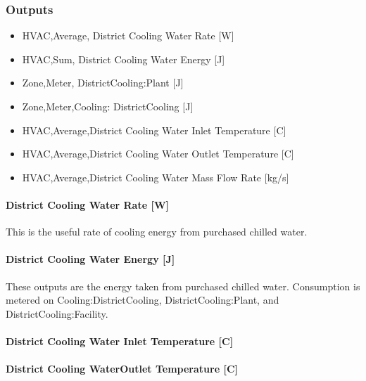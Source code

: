 \subsubsection{Outputs}\label{outputs-14-003}

\begin{itemize}
    \item
    HVAC,Average, District Cooling Water Rate {[}W{]}
    \item
    HVAC,Sum, District Cooling Water Energy {[}J{]}
    \item
    Zone,Meter, DistrictCooling:Plant {[}J{]}
    \item
    Zone,Meter,Cooling: DistrictCooling {[}J{]}
    \item
    HVAC,Average,District Cooling Water Inlet Temperature {[}C{]}
    \item
    HVAC,Average,District Cooling Water Outlet Temperature {[}C{]}
    \item
    HVAC,Average,District Cooling Water Mass Flow Rate {[}kg/s{]}
\end{itemize}

\paragraph{District Cooling Water Rate {[}W{]}}\label{district-cooling-chilled-water-rate-w}

This is the useful rate of cooling energy from purchased chilled water. 

\paragraph{District Cooling Water Energy {[}J{]}}\label{district-cooling-chilled-water-energy-j}

These outputs are the energy taken from purchased chilled water. Consumption is metered on Cooling:DistrictCooling, DistrictCooling:Plant, and DistrictCooling:Facility.

\paragraph{District Cooling Water Inlet Temperature {[}C{]}}\label{district-cooling-inlet-temperature-c}

\paragraph{District Cooling WaterOutlet Temperature {[}C{]}}\label{district-cooling-outlet-temperature-c}

